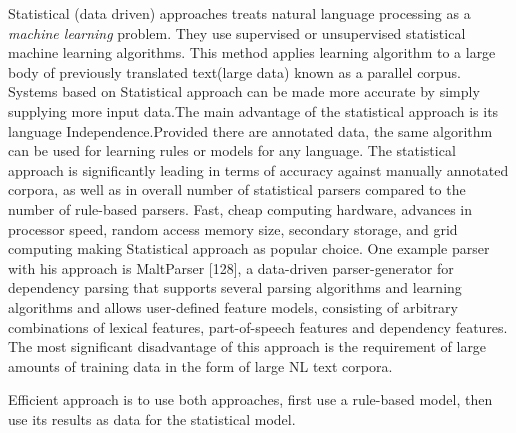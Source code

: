 \documentclass[sigconf]{acmart}
\begin{document}
   Statistical (data driven) approaches treats natural language processing as a \textit{machine learning} problem. They use supervised or unsupervised statistical machine learning algorithms. This method applies learning algorithm to a large body of previously translated text(large data) known as a parallel corpus. Systems based on Statistical approach can be made more accurate by simply supplying more input data.The main advantage of the statistical approach is its language Independence.Provided there are annotated data, the same algorithm can be used for learning rules or models for any language. The statistical approach is significantly  leading in terms of accuracy against manually annotated corpora, as well as in overall number of statistical parsers compared to the number of rule-based parsers. Fast, cheap computing hardware, advances in processor speed, random access memory size, secondary storage, and grid computing making Statistical approach as popular choice. One example parser with his approach is MaltParser [128], a data-driven parser-generator for dependency parsing  that  supports  several  parsing  algorithms  and  learning  algorithms and allows user-defined feature models, consisting of arbitrary combinations of lexical features, part-of-speech features and dependency features. The most significant disadvantage of this approach is the requirement of large amounts of training data in the form of large NL text corpora. 
\par\null\par
Efficient approach is to use both approaches, first use a rule-based model, then use its results as data for the statistical model. 
\end{document}
